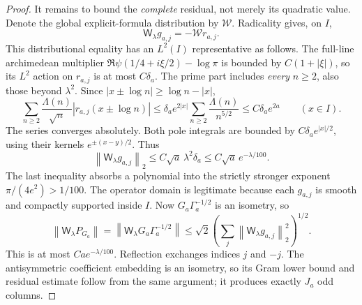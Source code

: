 \documentclass[11pt]{article}
\theoremstyle{remark}
\newcommand{\norm}[1]{\left\lVert #1\right\rVert}
\begin{document}
\begin{proof}
It remains to bound the \emph{complete} residual, not merely its
quadratic value.  Denote the global explicit-formula distribution by
$\mathcal W$.  Radicality gives, on $I$,
\[
 \mathsf W_\lambda g_{a,j}=-\mathcal W r_{a,j}.
\]
This distributional equality has an $L^2(I)$ representative as follows.
The full-line archimedean multiplier
$\Re\psi(1/4+i\xi/2)-\log\pi$ is bounded by $C(1+|\xi|)$,
so its $L^2$ action on $r_{a,j}$ is at most $C\delta_a$.
The prime part includes \emph{every} $n\ge2$, also those beyond
$\lambda^2$.  Since $|x\pm\log n|\ge\log n-|x|$,
\[
 \sum_{n\ge2}\frac{\Lambda(n)}{\sqrt n}
   |r_{a,j}(x\pm\log n)|
 \le\delta_a e^{2|x|}
             \sum_{n\ge2}\frac{\Lambda(n)}{n^{5/2}}
 \le C\delta_a e^{2a}\qquad(x\in I).
\]
The series converges absolutely.  Both pole integrals are bounded
by $C\delta_a e^{|x|/2}$, using their kernels $e^{\pm(x-y)/2}$.
Thus
\[
 \norm{\mathsf W_\lambda g_{a,j}}_2
 \le C\sqrt a\,\lambda^2\delta_a
 \le C\sqrt a\,e^{-\lambda/100}.
\]
The last inequality absorbs a polynomial into the strictly stronger
exponent $\pi/(4e^2)>1/100$.  The operator domain is legitimate
because each $g_{a,j}$ is smooth and compactly supported inside $I$.
Now $G_a\Gamma_a^{-1/2}$ is an isometry, so
\[
 \norm{\mathsf W_\lambda P_{G_a}}
 =\norm{\mathsf W_\lambda G_a\Gamma_a^{-1/2}}
 \le\sqrt2\left(\sum_j
             \norm{\mathsf W_\lambda g_{a,j}}_2^2\right)^{1/2}.
\]
This is at most $Ca e^{-\lambda/100}$.  Reflection exchanges
indices $j$ and $-j$.  The antisymmetric coefficient embedding is
an isometry, so its Gram lower bound and residual estimate follow
from the same argument; it produces exactly $J_a$ odd columns.
\end{proof}
\end{document}
